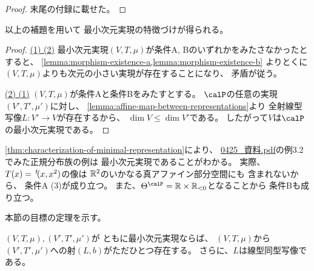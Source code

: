 \documentclass[report]{jlreq}
\begin{document}
\begin{proof}
    末尾の付録に載せた。
\end{proof}

以上の補題を用いて
最小次元実現の特徴づけが得られる。


\begin{proof}
    \uline{(1) \Rightarrow (2)} \quad
    最小次元実現$(V, T, \mu)$が条件A, Bのいずれかをみたさなかったとすると、
    \cref{lemma:morphism-existence-a,lemma:morphism-existence-b}
    よりとくに$(V, T, \mu)$よりも次元の小さい実現が存在することになり、
    矛盾が従う。

    \uline{(2) \Rightarrow (1)} \quad
    $(V, T, \mu)$が条件Aと条件Bをみたすとする。
    $\calP$の任意の実現
    $(V', T', \mu')$に対し、
    \cref{lemma:affine-map-between-representations}より
    全射線型写像$L: V' \to V$が存在するから、
    $\dim V \le \dim V'$である。
    したがって$V$は$\calP$の最小次元実現である。
\end{proof}

\begin{example}[正規分布族の最小次元実現]
    \cref{thm:characterization-of-minimal-representation}により、
    \url{0425_資料.pdf}の例3.2でみた正規分布族の例は
    最小次元実現であることがわかる。
    実際、
    $T(x) = \,{}^{t}\!(x, x^2)$の像は
    $\mathbb{R}^2$のいかなる真アファイン部分空間にも
    含まれないから、
    条件A (3)が成り立つ。
    また、$\Theta^\calP = \R \times \R_{< 0}$となることから
    条件Bも成り立つ。
\end{example}

本節の目標の定理を示す。

\begin{theorem}[最小次元実現の間のアファイン変換]
    $(V, T, \mu), (V', T', \mu')$が
    ともに最小次元実現ならば、
    $(V, T, \mu)$から$(V', T', \mu')$への射$(L, b)$がただひとつ存在する。
    さらに、$L$は線型同型写像である。
\end{theorem}
\end{document}
